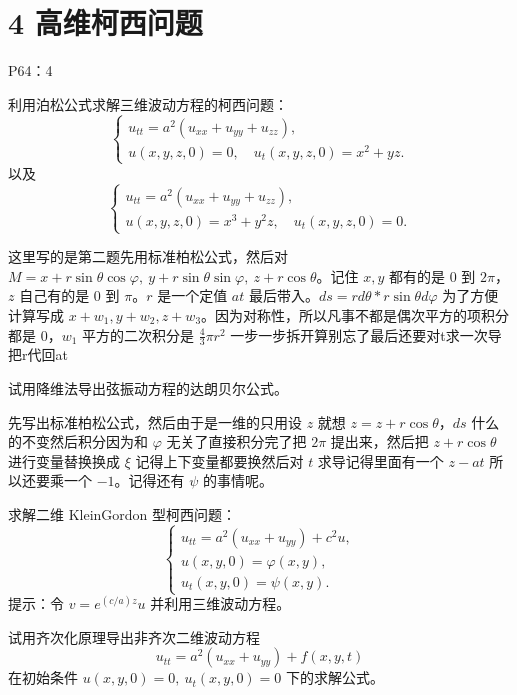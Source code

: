 \section{4 高维柯西问题}
P64：4
\begin{homework}
[1]利用泊松公式求解三维波动方程的柯西问题：
\[
\begin{cases}
u_{tt}=a^{2}(u_{xx}+u_{yy}+u_{zz}),\\
u(x,y,z,0)=0,\quad u_t(x,y,z,0)=x^{2}+yz.
\end{cases}
\]
以及
\[
\begin{cases}
u_{tt}=a^{2}(u_{xx}+u_{yy}+u_{zz}),\\
u(x,y,z,0)=x^{3}+y^{2}z,\quad u_t(x,y,z,0)=0.
\end{cases}
\]
\end{homework}
\begin{dxtips}
    这里写的是第二题先用标准柏松公式，然后对 $M=x+r\sin\theta\cos\varphi,\ y+r\sin\theta\sin\varphi,\ z+r\cos\theta$。记住 $x,y$ 都有的是 $0$ 到 $2\pi$，$z$ 自己有的是 $0$ 到 $\pi$。$r$ 是一个定值 $at$ 最后带入。$ds=rd\theta* r\sin\theta d\varphi$
为了方便计算写成 $x+w_1,y+w_2,z+w_3$。因为对称性，所以凡事不都是偶次平方的项积分都是 $0$，$w_1$ 平方的二次积分是 $\frac{4}{3}\pi r^2$
一步一步拆开算别忘了最后还要对t求一次导把r代回at
\end{dxtips}
\begin{homework}[2]
试用降维法导出弦振动方程的达朗贝尔公式。
\end{homework}
\begin{dxtips}
先写出标准柏松公式，然后由于是一维的只用设 $z$ 就想 $z=z+r\cos\theta$，$ds$ 什么的不变然后积分因为和 $\varphi$ 无关了直接积分完了把 $2\pi$ 提出来，然后把 $z+r\cos\theta$ 进行变量替换换成 $\xi$ 记得上下变量都要换然后对 $t$ 求导记得里面有一个 $z-at$ 所以还要乘一个 $-1$。记得还有 $\psi$ 的事情呢。
\end{dxtips}
\begin{homework}[5]
求解二维 Klein\text{--}Gordon 型柯西问题：
\[
\begin{cases}
u_{tt}=a^{2}(u_{xx}+u_{yy})+c^{2}u,\\
u(x,y,0)=\varphi(x,y),\\
u_t(x,y,0)=\psi(x,y).
\end{cases}
\]
提示：令 $v=e^{(c/a)z}u$ 并利用三维波动方程。
\end{homework}

\begin{homework}[6]
试用齐次化原理导出非齐次二维波动方程
\[
u_{tt}=a^{2}(u_{xx}+u_{yy})+f(x,y,t)
\]
在初始条件 $u(x,y,0)=0,\ u_t(x,y,0)=0$ 下的求解公式。
\end{homework}
